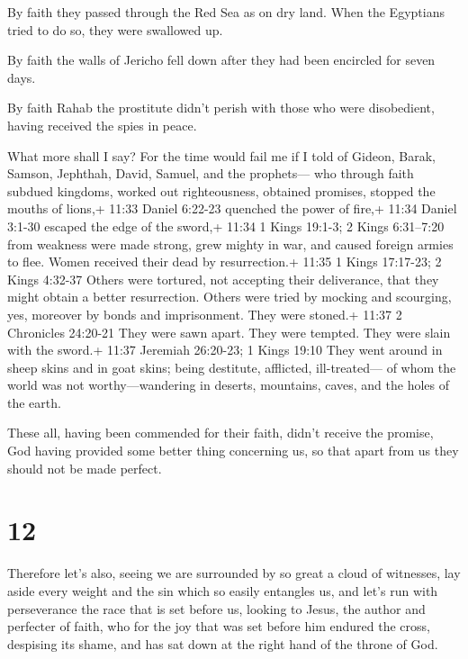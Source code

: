  By faith they passed through the Red Sea as on dry land.
When the Egyptians tried to do so, they were swallowed up.

 By faith the walls of Jericho fell down after they had
been encircled for seven days.

 By faith Rahab the prostitute didn't perish with those who
were disobedient, having received the spies in peace.

 What more shall I say? For the time would fail me if I
told of Gideon, Barak, Samson, Jephthah, David, Samuel, and the
prophets---  who through faith subdued kingdoms, worked out
righteousness, obtained promises, stopped the mouths of lions,+ 11:33
Daniel 6:22-23  quenched the power of fire,+ 11:34 Daniel
3:1-30 escaped the edge of the sword,+ 11:34 1 Kings 19:1-3; 2 Kings
6:31--7:20 from weakness were made strong, grew mighty in war, and
caused foreign armies to flee.  Women received their dead
by resurrection.+ 11:35 1 Kings 17:17-23; 2 Kings 4:32-37 Others were
tortured, not accepting their deliverance, that they might obtain a
better resurrection.  Others were tried by mocking and
scourging, yes, moreover by bonds and imprisonment.  They
were stoned.+ 11:37 2 Chronicles 24:20-21 They were sawn apart. They
were tempted. They were slain with the sword.+ 11:37 Jeremiah 26:20-23;
1 Kings 19:10 They went around in sheep skins and in goat skins; being
destitute, afflicted, ill-treated---  of whom the world was
not worthy---wandering in deserts, mountains, caves, and the holes of
the earth.

 These all, having been commended for their faith, didn't
receive the promise,  God having provided some better thing
concerning us, so that apart from us they should not be made perfect.

\hypertarget{section-11}{%
\section{12}\label{section-11}}

 Therefore let's also, seeing we are surrounded by so great
a cloud of witnesses, lay aside every weight and the sin which so easily
entangles us, and let's run with perseverance the race that is set
before us,  looking to Jesus, the author and perfecter of
faith, who for the joy that was set before him endured the cross,
despising its shame, and has sat down at the right hand of the throne of
God.

